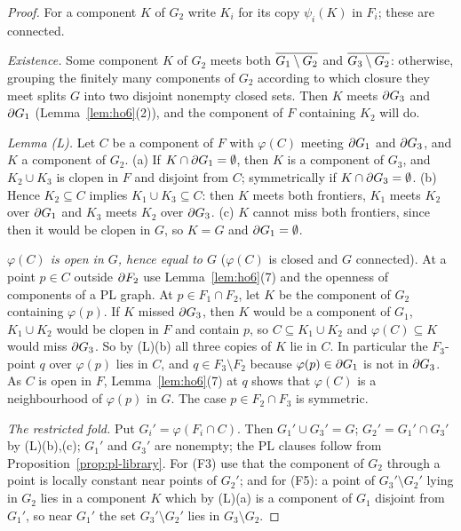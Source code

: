 \begin{proof}
For a component $K$ of $G_2$ write $K_i$ for its copy $\psi_i(K)$ in $F_i$; these are connected.

\emph{Existence.} Some component $K$ of $G_2$ meets both $\overline{G_1\setminus G_2}$ and $\overline{G_3\setminus G_2}$: otherwise, grouping the finitely many components of $G_2$
according to which closure they meet splits $G$ into two disjoint nonempty closed sets. Then $K$ meets $\partial G_3$ and $\partial G_1$ (Lemma~\ref{lem:ho6}(2)), and the
component of $F$ containing $K_2$ will do.

\emph{Lemma (L).} Let $C$ be a component of $F$ with $\varphi(C)$ meeting $\partial G_1$ and $\partial G_3$, and $K$ a component of $G_2$. (a) If $K\cap\partial G_1=\emptyset$, then $K$ is a
component of $G_3$, and $K_2\cup K_3$ is clopen in $F$ and disjoint from $C$; symmetrically if $K\cap\partial G_3=\emptyset$. (b) Hence $K_2\subseteq C$ implies $K_1\cup K_3\subseteq C$:
then $K$ meets both frontiers, $K_1$ meets $K_2$ over $\partial G_1$ and $K_3$ meets $K_2$ over $\partial G_3$. (c) $K$ cannot miss both frontiers, since then it would be clopen in
$G$, so $K=G$ and $\partial G_1=\emptyset$.

\emph{$\varphi(C)$ is open in $G$, hence equal to $G$} ($\varphi(C)$ is closed and $G$ connected). At a point $p\in C$ outside $\partial F_2$ use Lemma~\ref{lem:ho6}(7) and the
openness of components of a PL graph. At $p\in F_1\cap F_2$, let $K$ be the component of $G_2$ containing $\varphi(p)$. If $K$ missed $\partial G_3$, then $K$ would be a
component of $G_1$, $K_1\cup K_2$ would be clopen in $F$ and contain $p$, so $C\subseteq K_1\cup K_2$ and $\varphi(C)\subseteq K$ would miss $\partial G_3$. So by (L)(b) all three copies
of $K$ lie in $C$. In particular the $F_3$-point $q$ over $\varphi(p)$ lies in $C$, and $q\in F_3\setminus F_2$ because $\varphi(p)\in\partial G_1$ is not in $\partial G_3$. As $C$ is
open in $F$, Lemma~\ref{lem:ho6}(7) at $q$ shows that $\varphi(C)$ is a neighbourhood of $\varphi(p)$ in $G$. The case $p\in F_2\cap F_3$ is symmetric.

\emph{The restricted fold.} Put $G_i'=\varphi(F_i\cap C)$. Then $G_1'\cup G_3'=G$; $G_2'=G_1'\cap G_3'$ by (L)(b),(c); $G_1'$ and $G_3'$ are nonempty; the PL clauses
follow from Proposition~\ref{prop:pl-library}. For (F3) use that the component of $G_2$ through a point is locally constant near points of $G_2'$; and for (F5):
a point of $G_3'\setminus G_2'$ lying in $G_2$ lies in a component $K$ which by (L)(a) is a component of $G_1$ disjoint from $G_1'$, so near $G_1'$ the set $G_3'\setminus G_2'$ lies in
$G_3\setminus G_2$.
\end{proof}

